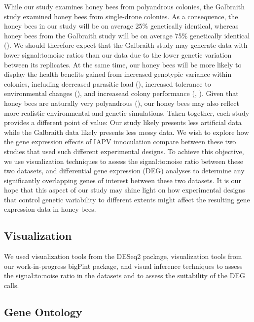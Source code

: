 \documentclass[11pt,a4paper,oldfontcommands,openany]{memoir}
\numberwithin{equation}{section} %
\begin{document}
While our study examines honey bees from polyandrous colonies, the Galbraith study examined honey bees from single-drone colonies. As a consequence, the honey bees in our study will be on average 25\% genetically identical, whereas honey bees from the Galbraith study will be on average 75\% genetically identical (\citealt{sisters}). We should therefore expect that the Galbraith study may generate data with lower signal:to:noise ratios than our data due to the lower genetic variation between its replicates. At the same time, our honey bees will be more likely to display the health benefits gained from increased genotypic variance within colonies, including decreased parasitic load (\citealt{multParasite}), increased tolerance to environmental changes (\citealt{divHyp2}), and increasead colony performance (\citealt{geneticDiverse}, \citealt{geneticDiverse2}). Given that honey bees are naturally very polyandrous (\citealt{patriline}), our honey bees may also reflect more realistic environmental and genetic simulations. Taken together, each study provides a different point of value: Our study likely presents less artificial data while the Galbraith data likely presents less messy data. We wish to explore how the gene expression effects of IAPV innoculation compare between these two studies that used such different experimental designs. To achieve this objective, we use visualization techniques to assess the signal:to:noise ratio between these two datasets, and differential gene expression (DEG) analyses to determine any significantly overlapping genes of interest between these two datasets. It is our hope that this aspect of our study may shine light on how experimental designs that control genetic variability to different extents might affect the resulting gene expression data in honey bees.

\subsection{Visualization}

We used visualization tools from the DESeq2 package, visualization tools from our work-in-progress bigPint package, and visual inference techniques to assess the signal:to:noise ratio in the datasets and to assess the suitability of the DEG calls. 

\subsection{Gene Ontology}
\end{document}
